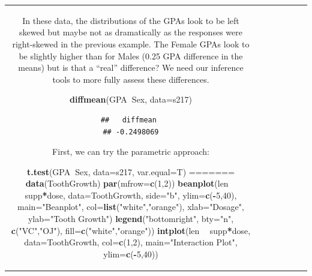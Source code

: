 \documentclass[]{book}
\newenvironment{Shaded}{\begin{snugshade}}{\end{snugshade}}
\newcommand{\KeywordTok}[1]{\textcolor[rgb]{0.13,0.29,0.53}{\textbf{#1}}}
\newcommand{\DataTypeTok}[1]{\textcolor[rgb]{0.13,0.29,0.53}{#1}}
\newcommand{\DecValTok}[1]{\textcolor[rgb]{0.00,0.00,0.81}{#1}}
\newcommand{\StringTok}[1]{\textcolor[rgb]{0.31,0.60,0.02}{#1}}
\newcommand{\OperatorTok}[1]{\textcolor[rgb]{0.81,0.36,0.00}{\textbf{#1}}}
\newcommand{\NormalTok}[1]{#1}
\theoremstyle{definition}
\theoremstyle{definition}
\theoremstyle{remark}
\begin{document}
\begin{longtable}[]{@{}ccccccc@{}}
\begin{minipage}[b]{0.10\columnwidth}
\begin{Shaded}
\begin{Highlighting}[]
\begin{Shaded}
\begin{Highlighting}[]
In these data, the distributions of the GPAs look to be left skewed but
maybe not as dramatically as the responses were right-skewed in the
previous example. The Female GPAs look to be slightly higher than for
Males (0.25 GPA difference in the means) but is that a ``real''
difference? We need our inference tools to more fully assess these
differences.

\begin{Shaded}
\begin{Highlighting}[]
\KeywordTok{diffmean}\NormalTok{(GPA}\OperatorTok{~}\NormalTok{Sex, }\DataTypeTok{data=}\NormalTok{s217)}
\end{Highlighting}
\end{Shaded}

\begin{verbatim}
##   diffmean 
## -0.2498069
\end{verbatim}

First, we can try the parametric approach:

\begin{Shaded}
\begin{Highlighting}[]
\KeywordTok{t.test}\NormalTok{(GPA}\OperatorTok{~}\NormalTok{Sex, }\DataTypeTok{data=}\NormalTok{s217, }\DataTypeTok{var.equal=}\NormalTok{T)}
=======
\KeywordTok{data}\NormalTok{(ToothGrowth)}
\KeywordTok{par}\NormalTok{(}\DataTypeTok{mfrow=}\KeywordTok{c}\NormalTok{(}\DecValTok{1}\NormalTok{,}\DecValTok{2}\NormalTok{))}
\KeywordTok{beanplot}\NormalTok{(len }\OperatorTok{~}\StringTok{ }\NormalTok{supp}\OperatorTok{*}\NormalTok{dose, }\DataTypeTok{data=}\NormalTok{ToothGrowth, }\DataTypeTok{side=}\StringTok{"b"}\NormalTok{, }\DataTypeTok{ylim=}\KeywordTok{c}\NormalTok{(}\OperatorTok{-}\DecValTok{5}\NormalTok{,}\DecValTok{40}\NormalTok{),}
         \DataTypeTok{main=}\StringTok{"Beanplot"}\NormalTok{, }\DataTypeTok{col=}\KeywordTok{list}\NormalTok{(}\StringTok{"white"}\NormalTok{,}\StringTok{"orange"}\NormalTok{), }\DataTypeTok{xlab=}\StringTok{"Dosage"}\NormalTok{,}
         \DataTypeTok{ylab=}\StringTok{"Tooth Growth"}\NormalTok{)}
\KeywordTok{legend}\NormalTok{(}\StringTok{"bottomright"}\NormalTok{, }\DataTypeTok{bty=}\StringTok{"n"}\NormalTok{, }\KeywordTok{c}\NormalTok{(}\StringTok{"VC"}\NormalTok{,}\StringTok{"OJ"}\NormalTok{), }\DataTypeTok{fill=}\KeywordTok{c}\NormalTok{(}\StringTok{"white"}\NormalTok{,}\StringTok{"orange"}\NormalTok{))}
\KeywordTok{intplot}\NormalTok{(len }\OperatorTok{~}\StringTok{ }\NormalTok{supp}\OperatorTok{*}\NormalTok{dose, }\DataTypeTok{data=}\NormalTok{ToothGrowth, }\DataTypeTok{col=}\KeywordTok{c}\NormalTok{(}\DecValTok{1}\NormalTok{,}\DecValTok{2}\NormalTok{), }
        \DataTypeTok{main=}\StringTok{"Interaction Plot"}\NormalTok{, }\DataTypeTok{ylim=}\KeywordTok{c}\NormalTok{(}\OperatorTok{-}\DecValTok{5}\NormalTok{,}\DecValTok{40}\NormalTok{))}
\end{Highlighting}
\end{Shaded}


\end{Highlighting}
\end{Shaded}
\end{Highlighting}
\end{Shaded}
\end{minipage}
\end{longtable}
\end{document}
